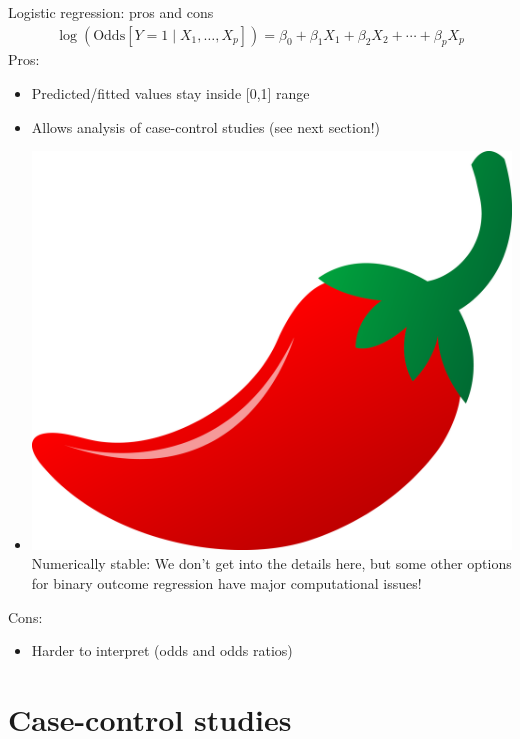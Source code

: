 \documentclass[10pt,t]{beamer}
\begin{document}
\begin{frame}{Logistic regression: pros and cons}
	\begin{align*}
		\log(\text{Odds}[Y = 1 \mid X_1,\dots, X_p]) = \beta_0 + \beta_1X_1 + \beta_2X_2 + \cdots + \beta_pX_p
	\end{align*}
	Pros:
	\begin{itemize}
		\item Predicted/fitted values stay inside [0,1] range
		\item Allows analysis of case-control studies (see next section!)
		\item \includegraphics[scale=0.01]{./figs/chilipepper} Numerically stable: We don't get into the details here, but some other options for binary outcome regression have major computational issues!
	\end{itemize}
	Cons:
	\begin{itemize}
		\item Harder to interpret (odds and odds ratios)
	\end{itemize}
\end{frame}

\section{Case-control studies}
\end{document}
